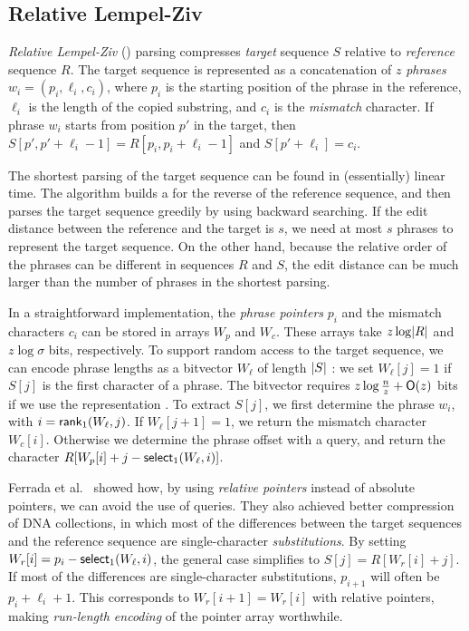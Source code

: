 \subsection{Relative Lempel-Ziv}\label{sect:rlz}

\emph{Relative Lempel-Ziv} (\RLZ) parsing \cite{Kuruppu2010} compresses
\emph{target} sequence $S$ relative to \emph{reference} sequence $R$. The
target sequence is represented as a concatenation of $z$ \emph{phrases} $w_{i}
= (p_{i}, \ell_{i}, c_{i})$, where $p_{i}$ is the starting position of the
phrase in the reference, $\ell_{i}$ is the length of the copied substring, and
$c_{i}$ is the \emph{mismatch} character. If phrase $w_{i}$ starts from
position $p'$ in the target, then $S[p',p'+\ell_{i}-1] =
R[p_{i},p_{i}+\ell_{i}-1]$ and $S[p'+\ell_{i}] = c_{i}$.

The shortest \RLZ{} parsing of the target sequence can be found in
(essentially) linear time. The algorithm builds a \CSA{} for the reverse of
the reference sequence, and then parses the target sequence greedily by using
backward searching. If the edit distance between the reference and the target
is $s$, we need at most $s$ phrases to represent the target sequence. On the
other hand, because the relative order of the phrases can be different in
sequences $R$ and $S$, the edit distance can be much larger than the number of
phrases in the shortest \RLZ{} parsing.

In a straightforward implementation, the \emph{phrase pointers} $p_{i}$ and
the mismatch characters $c_{i}$ can be stored in arrays $W_{p}$ and
$W_{c}$. These arrays take $z \log \lvert R \rvert$ and $z \log \sigma$ bits,
respectively. To support random access to the target sequence, we can encode
phrase lengths as a bitvector $W_{\ell}$ of length $\lvert S \rvert$ \cite{Kuruppu2010}:
we set $W_{\ell}[j] = 1$ if $S[j]$ is the first character of a phrase. The
bitvector requires $z \log \frac{n}{z} + \mathsf{O}(z)$ bits if we use the
\sdarray{} representation \cite{Okanohara2007}. To extract $S[j]$, we first
determine the phrase $w_{i}$, with $i = \mathsf{rank}_{1}(W_{\ell}, j)$. If
$W_{\ell}[j+1] = 1$, we return the mismatch character $W_{c}[i]$. Otherwise
we determine the phrase offset with a \select{} query, and return the character
$R[W_{p}[i] + j - \mathsf{select}_{1}(W_{\ell}, i)]$.

Ferrada et al.~\cite{Ferrada2014} showed how, by using \emph{relative pointers} instead of absolute pointers, we can avoid the use of \select{} queries. They also achieved better compression of DNA collections, in which most of the differences between the target sequences and the reference sequence are single-character \emph{substitutions}. By setting $W_{r}[i] = p_{i} - \mathsf{select}_{1}(W_{\ell}, i)$, the general case simplifies to $S[j] = R[W_{r}[i] + j]$.  If most of the differences are single-character substitutions, $p_{i+1}$ will often be $p_{i} + \ell_{i} + 1$. This corresponds to $W_{r}[i+1] = W_{r}[i]$ with relative pointers, making \emph{run-length encoding} of the pointer array worthwhile.

